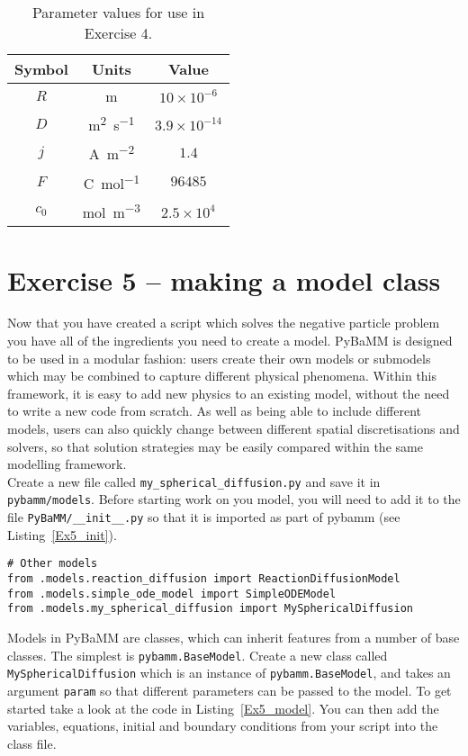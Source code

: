 \documentclass[a4paper,11pt]{article}
\begin{document}
\begin{table}[htb]
	\centering
	\begin{tabular}{c c c}
	\toprule
     Symbol & Units & Value \\
    \midrule
    $R$ & \si{m} & $10 \times 10^{-6}$\\
    $D$ & \si{m^2.s^{-1}} & $3.9 \times 10^{-14}$ \\
    $j$ & \si{A.m^{-2}} & $1.4$ \\
    $F$ & \si{C.mol^{-1}} & $96485$ \\
    $c_0$ & \si{mol.m^{-3}} & $2.5 \times 10^4$ \\
    \bottomrule
    \end{tabular}
    \caption{Parameter values for use in Exercise 4.}
    \label{Table:Ex4}
\end{table}

\pagebreak
\section*{Exercise 5 -- making a model class}
Now that you have created a script which solves the negative particle problem you have all of the ingredients you need to create a model. PyBaMM is designed to be used in a modular fashion: users create their own models or submodels which may be combined to capture different physical phenomena. Within this framework, it is easy to add new physics to an existing model, without the need to write a new code from scratch. As well as being able to include different models, users can also quickly change between different spatial discretisations and solvers, so that solution strategies may be easily compared within the same modelling framework. \\

Create a new file called \texttt{my\_spherical\_diffusion.py} and save it in \texttt{pybamm/models}. Before starting work on you model, you will need to add it to the file \texttt{PyBaMM/\_\_init\_\_.py} so that it is imported as part of pybamm (see Listing~\ref{Ex5_init}).

\begin{lstlisting}[label={Ex5_init},caption=Adding you new model to the init file., firstnumber=148]
# Other models
from .models.reaction_diffusion import ReactionDiffusionModel
from .models.simple_ode_model import SimpleODEModel
from .models.my_spherical_diffusion import MySphericalDiffusion
\end{lstlisting}

Models in PyBaMM are classes, which can inherit features from a number of base classes. The simplest is \texttt{pybamm.BaseModel}. Create a new class called \texttt{MySphericalDiffusion} which is an instance of \texttt{pybamm.BaseModel}, and takes an argument \texttt{param} so that different parameters can be passed to the model. To get started take a look at the code in Listing~\ref{Ex5_model}. You can then add the variables, equations, initial and boundary conditions from your script into the class file.
\end{document}
